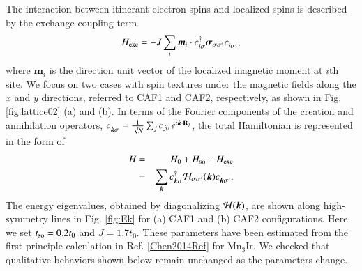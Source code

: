 \documentclass[letter,twocolumn,amsmath,amssymb,superscriptaddress]{jpsj3}
\newcommand{\vm}{\bm{m}}
\newcommand{\vk}{\bm{k}}
\newcommand{\vs}{\bm{\sigma}}
\begin{document}
The interaction between itinerant electron spins and localized spins is described by the exchange coupling term
\begin{equation}
  H_{\rm exc} =-J\sum_i \vm_i\cdot c^{\dag}_{i\sigma}\vs_{\sigma\sigma'} c_{i\sigma'}^{},
\end{equation}
where $\vm_i$ is the direction unit vector of the localized magnetic moment at $i$th site.
We focus on two cases with spin textures under the magnetic fields along the $x$ and $y$ directions, referred to CAF1 and CAF2, respectively, as shown in Fig. \ref{fig:lattice02} (a) and (b).
%
In terms of the Fourier components of the creation and annihilation operators, $c_{\vk\sigma}^{}=\frac{1}{\sqrt{N}}\sum_j c_{j\sigma}e^{i\vk\cdot{\bf R}_j}$, the total Hamiltonian is represented in the form of
\begin{eqnarray}
 H&=& H_0+H_{\rm so}+H_{\rm exc} \nonumber\\
&=&\sum_{\vk} c^{\dag}_{\vk\sigma}{\cal H}_{\sigma\sigma'}(\vk)c^{}_{\vk\sigma'}.
\label{H_total}
\end{eqnarray}
The energy eigenvalues, obtained by diagonalizing ${\cal H}(\vk)$, are shown along high-symmetry lines in Fig. \ref{fig:Ek} for (a) CAF1 and (b) CAF2 configurations.
Here we set $t_{\rm so}=0.2t_0$ and $J=1.7t_0$. These parameters have been estimated from the first principle calculation in Ref. \ref{Chen2014Ref} for Mn$_3$Ir. We checked that qualitative behaviors shown below remain unchanged as the parameters change.



\end{document}
